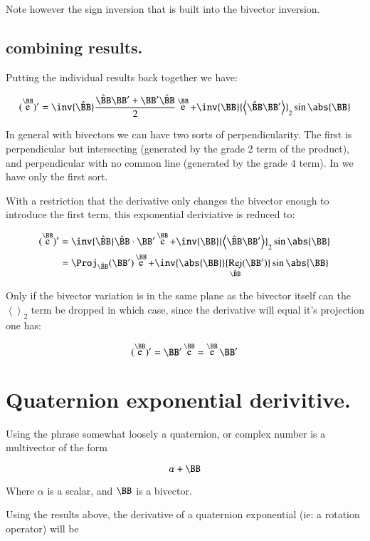 \documentclass{article}      %
\DeclareMathOperator{\Exp}{e}
\DeclareMathOperator{\Rej}{Rej}
\newcommand{\Bcap}[0]{\hat{\BB}}
\newcommand{\Babs}[0]{\abs{\BB}}
\newcommand{\gpgrade}[2] {{\left\langle{{#1}}\right\rangle}_{#2}}
\newcommand{\gpgradetwo}[1] {\gpgrade{#1}{2}}
\begin{document}
Note however the sign inversion that is built into the bivector inversion.

\subsection{ combining results. }

Putting the individual results back together we have:

\begin{equation}
(\Exp^{\BB})'
= \inv{\Bcap}\frac{\Bcap\BB' + \BB'\Bcap}{2} \Exp^{\BB} + \inv{\BB}\gpgradetwo{\Bcap\BB'} \sin\Babs 
\end{equation}

In general with bivectors we can have two sorts of perpendicularity.  The first is perpendicular but intersecting (generated by the grade 2 term of the product), and perpendicular with no common line (generated by the grade 4 term).
In  we have only the first sort.

With a restriction that the derivative only changes the bivector enough to introduce the first term, this
exponential deriviative is reduced to:

\begin{align*}
(\Exp^{\BB})'
&= \inv{\Bcap}\Bcap \cdot \BB' \Exp^{\BB} + \inv{\BB}\gpgradetwo{\Bcap\BB'} \sin\Babs \\
&= \Proj_{\Bcap}(\BB') \Exp^{\BB} + \inv{\Babs}{\Rej_{\Bcap}(\BB')} \sin\Babs \\
\end{align*}

Only if the bivector variation is in the same plane as the bivector itself can the $\gpgradetwo{}$ term be dropped
in which case, since the derivative will equal it's projection one has:

\begin{equation}
(\Exp^{\BB})' = \BB' \Exp^{\BB} = \Exp^{\BB} \BB' 
\end{equation}

\section{ Quaternion exponential derivitive. } 

Using the phrase somewhat loosely a quaternion, or complex number is a multivector of the form

\[
\alpha + \BB
\]

Where $\alpha$ is a scalar, and $\BB$ is a bivector.

Using the results above, the derivative of a quaternion exponential (ie: a rotation operator) will be
\end{document}
